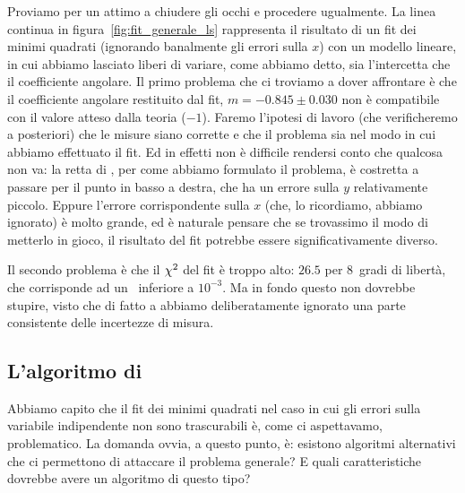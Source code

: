 Proviamo per un attimo a chiudere gli occhi e procedere ugualmente. La linea
continua in figura~\ref{fig:fit_generale_ls} rappresenta il risultato di un
fit dei minimi quadrati (ignorando banalmente gli errori sulla $x$) con un
modello lineare, in cui abbiamo lasciato liberi di variare, come abbiamo detto,
sia l'intercetta che il coefficiente angolare. Il primo problema che ci troviamo
a dover affrontare è che il coefficiente angolare restituito dal fit,
$m = -0.845 \pm 0.030$ non è compatibile con il valore atteso dalla teoria
($-1$). Faremo l'ipotesi di lavoro (che verificheremo a posteriori) che le
misure siano corrette e che il problema sia nel modo in cui abbiamo effettuato
il fit. Ed in effetti non è difficile rendersi conto che qualcosa non
va: la retta di \bestfit, per come abbiamo formulato il problema, è
costretta a passare per il punto in basso a destra, che ha un errore sulla
$y$ relativamente piccolo. Eppure l'errore corrispondente sulla $x$ (che, lo
ricordiamo, abbiamo ignorato) è molto grande, ed è naturale pensare che
se trovassimo il modo di metterlo in gioco, il risultato del fit potrebbe
essere significativamente diverso.

Il secondo problema è che il $\chi^2$ del fit è troppo alto: $26.5$ per
$8$~gradi di libertà, che corrisponde ad un \pvalue~inferiore a $10^{-3}$.
Ma in fondo questo non dovrebbe stupire, visto che di fatto a abbiamo
deliberatamente ignorato una parte consistente delle incertezze di misura.


\subsection{L'algoritmo di }

Abbiamo capito che il fit dei minimi quadrati nel caso in cui gli errori
sulla variabile indipendente non sono trascurabili è, come ci aspettavamo,
problematico. La domanda ovvia, a questo punto, è: esistono algoritmi
alternativi che ci permettono di attaccare il problema generale? E quali
caratteristiche dovrebbe avere un algoritmo di questo tipo?


